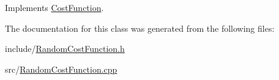 Implements \hyperlink{class_cost_function_ada1a1003e80f4f0e57b20d9a1e6a51c6}{Cost\+Function}.



The documentation for this class was generated from the following files\+:\begin{DoxyCompactItemize}
\item 
include/\hyperlink{_random_cost_function_8h}{Random\+Cost\+Function.\+h}\item 
src/\hyperlink{_random_cost_function_8cpp}{Random\+Cost\+Function.\+cpp}\end{DoxyCompactItemize}
